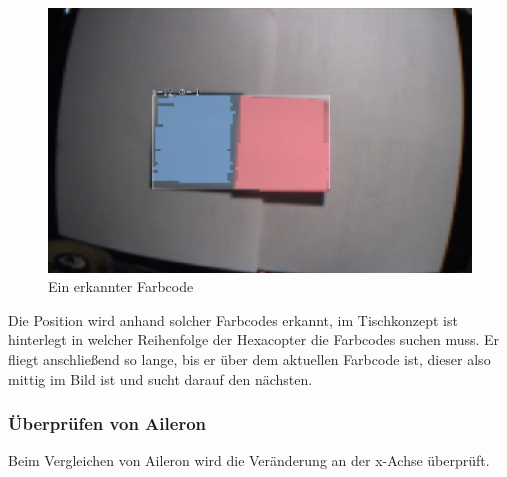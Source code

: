     \begin{figure} [tbh]
      \begin{centering}
        \includegraphics[width = \textwidth]{Bilder/Farbcode_erkannt}
      \par\end{centering}
      \caption{Ein erkannter Farbcode}
      \label{Farbcode_erkannt}
    \end{figure}
    Die Position wird anhand solcher Farbcodes erkannt, im Tischkonzept ist hinterlegt in welcher Reihenfolge der Hexacopter die Farbcodes suchen muss.
    Er fliegt anschließend so lange, bis er über dem aktuellen Farbcode ist, dieser also mittig im Bild ist und sucht darauf den nächsten.

    \subsubsection{Überprüfen von Aileron}
    Beim Vergleichen von Aileron wird die Veränderung an der x-Achse überprüft.

